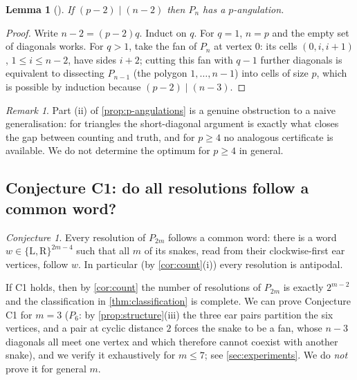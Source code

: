 \documentclass[11pt,a4paper]{article}
\newtheorem{lemma}[theorem]{Lemma}
\theoremstyle{definition}
\theoremstyle{remark}
\newtheorem{remark}[theorem]{Remark}
\newtheorem{conjecture}[theorem]{Conjecture}
\newcommand{\Li}{\mathrm{L}}
\newcommand{\Ri}{\mathrm{R}}
\begin{document}
\begin{lemma}[\label{lem:p-angulation-exists}]
If $(p-2)\mid(n-2)$ then $P_n$ has a $p$-angulation.
\end{lemma}

\begin{proof}
Write $n-2=(p-2)q$.  Induct on $q$.  For $q=1$, $n=p$ and the empty set of diagonals works.
For $q>1$, take the fan of $P_n$ at vertex $0$: its cells $(0,i,i+1)$, $1\le i\le n-2$, have
sides $i+2$; cutting this fan with $q-1$ further diagonals is equivalent to dissecting
$P_{n-1}$ (the polygon $1,\dots,n-1$) into cells of size $p$, which is possible by
induction because $(p-2)\mid(n-3)$.
\end{proof}

\begin{remark}
Part (ii) of \cref{prop:p-angulations} is a genuine obstruction to a naive generalisation:
for triangles the short-diagonal argument is exactly what closes the gap between counting and
truth, and for $p\ge4$ no analogous certificate is available.  We do not determine the
optimum for $p\ge4$ in general.
\end{remark}

\subsection{Conjecture C1: do all resolutions follow a common word?}

\begin{conjecture}
Every resolution of $P_{2m}$ follows a common word: there is a word
$w\in\{\Li,\Ri\}^{2m-4}$ such that all $m$ of its snakes, read from their clockwise-first
ear vertices, follow $w$.  In particular (by \cref{cor:count}(i)) every resolution is
antipodal.
\end{conjecture}

If C1 holds, then by \cref{cor:count} the number of resolutions of $P_{2m}$ is exactly
$2^{m-2}$ and the classification in \cref{thm:classification} is complete.  We can prove
Conjecture C1 for $m=3$ ($P_6$: by \cref{prop:structure}(iii) the three ear pairs partition
the six vertices, and a pair at cyclic distance $2$ forces the snake to be a fan, whose
$n-3$ diagonals all meet one vertex and which therefore cannot coexist with another
snake), and we verify it exhaustively for $m\le7$; see \cref{sec:experiments}.  We do
\emph{not} prove it for general $m$.
\end{document}
